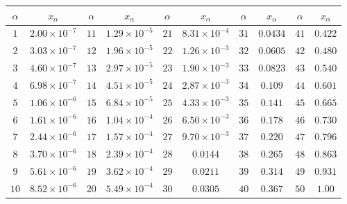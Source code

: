 \begin{tabular}{|c|c|c|c|c|c|c|c|c|c|}
    \hline
    $\alpha$ & $x_\alpha$ & $\alpha$ & $x_\alpha$ & $\alpha$ & $x_\alpha$ & $\alpha$ & $x_\alpha$ & $\alpha$ & $x_\alpha$ \\
    \hline
    $1$  & $2.00 \times 10^{-7}$ & $11$ & $1.29 \times 10^{-5}$ & $21$ & $8.31 \times 10^{-4}$ & $31$ & $0.0434$ & $41$ & $0.422$ \\
    $2$  & $3.03 \times 10^{-7}$ & $12$ & $1.96 \times 10^{-5}$ & $22$ & $1.26 \times 10^{-3}$ & $32$ & $0.0605$ & $42$ & $0.480$ \\
    $3$  & $4.60 \times 10^{-7}$ & $13$ & $2.97 \times 10^{-5}$ & $23$ & $1.90 \times 10^{-3}$ & $33$ & $0.0823$ & $43$ & $0.540$ \\
    $4$  & $6.98 \times 10^{-7}$ & $14$ & $4.51 \times 10^{-5}$ & $24$ & $2.87 \times 10^{-3}$ & $34$ & $0.109$ & $44$ & $0.601$ \\
    $5$  & $1.06 \times 10^{-6}$ & $15$ & $6.84 \times 10^{-5}$ & $25$ & $4.33 \times 10^{-3}$ & $35$ & $0.141$ & $45$ & $0.665$ \\
    $6$  & $1.61 \times 10^{-6}$ & $16$ & $1.04 \times 10^{-4}$ & $26$ & $6.50 \times 10^{-3}$ & $36$ & $0.178$ & $46$ & $0.730$ \\
    $7$  & $2.44 \times 10^{-6}$ & $17$ & $1.57 \times 10^{-4}$ & $27$ & $9.70 \times 10^{-3}$ & $37$ & $0.220$ & $47$ & $0.796$ \\
    $8$  & $3.70 \times 10^{-6}$ & $18$ & $2.39 \times 10^{-4}$ & $28$ & $0.0144$ & $38$ & $0.265$ & $48$ & $0.863$ \\
    $9$  & $5.61 \times 10^{-6}$ & $19$ & $3.62 \times 10^{-4}$ & $29$ & $0.0211$ & $39$ & $0.314$ & $49$ & $0.931$ \\
    $10$ & $8.52 \times 10^{-6}$ & $20$ & $5.49 \times 10^{-4}$ & $30$ & $0.0305$ & $40$ & $0.367$ & $50$ & $1.00$ \\
    \hline
\end{tabular}
